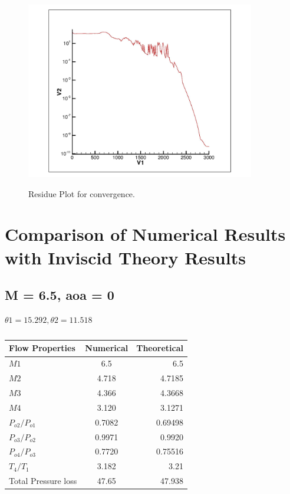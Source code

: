 \documentclass{article}
\begin{document}
\begin{figure}[H]   \label{figure}
\includegraphics[width=10cm]{5.5/resid_2.jpg}		%
\label{figure:}
\caption{Residue Plot for convergence.}
\end{figure}

\newpage
\section*{Comparison of Numerical Results with Inviscid Theory Results}
\subsection*{M = 6.5, aoa = 0}
$\theta1 = 15.292, \theta2 = 11.518$
\begin{table}[h]
  \centering
  \caption{}
  \label{tab:table2}
  \begin{tabular}{l||c|r}
    Flow Properties & Numerical & Theoretical\\
    \hline
    $M1$ & 6.5 & 6.5\\
    \hline
    $M2$ & 4.718 & 4.7185\\
    \hline
    $M3$ & 4.366 & 4.3668\\
    \hline
    $M4$ & 3.120 & 3.1271\\
    \hline
    $P_{o2}/P_{o1}$ & 0.7082 & 0.69498\\
    \hline
    $P_{o3}/P_{o2}$ & 0.9971 & 0.9920\\
    \hline
    $P_{o4}/P_{o3}$ & 0.7720 & 0.75516\\
    \hline
    $T_{4}/T_{1}$ & 3.182 & 3.21\\
    \hline
    Total Pressure loss & 47.65  & 47.938\\
    
  \end{tabular}
\end{table}
\end{document}
